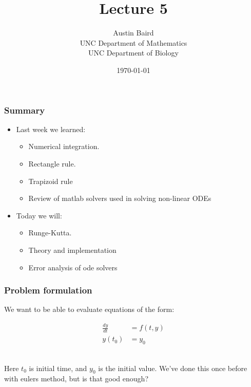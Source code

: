 \documentclass{beamer}
\title{Lecture 5}
\author{Austin Baird\\UNC Department of Mathematics\\UNC Department of Biology}
\date{\today}
\begin{document}
\frame{\titlepage}

\begin{frame}
\frametitle{Summary}
\begin{itemize}

\item Last week we learned: 
\begin{itemize}
\item Numerical integration.
\item Rectangle rule.
\item Trapizoid rule
\item Review of matlab solvers used in solving non-linear ODEs
\end{itemize}
\item Today we will: 
\begin{itemize}
\item Runge-Kutta.
\item Theory and implementation 
\item Error analysis of ode solvers
\end{itemize}
\end{itemize}

\end{frame}

\begin{frame}
\frametitle{Problem formulation}

We want to be able to evaluate equations of the form: 

\begin{align*}
\frac{dy}{dt} &= f(t,y)\\
y(t_0) &= y_0
\end{align*}

\ \\

Here $t_0$ is initial time, and $y_0$ is the initial value. We've done this once before with eulers method, but is that good enough? 
\end{frame}
\end{document}
